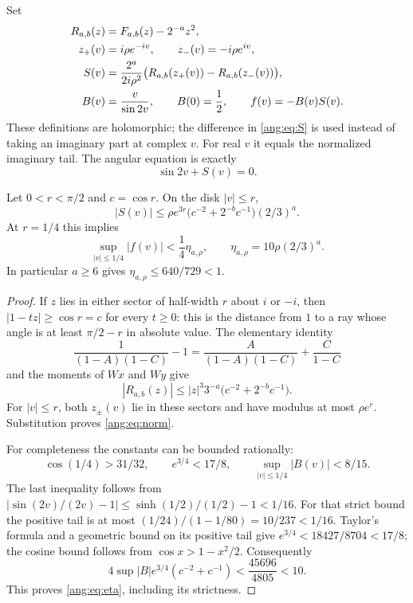 Set
\begin{align}
 R_{a,b}(z)&=F_{a,b}(z)-2^{-a}z^2,\notag\\
 z_+(v)&=i\rho e^{-iv},\qquad z_-(v)=-i\rho e^{iv},\notag\\
 S(v)&=\frac{2^a}{2i\rho^2}
       \bigl(R_{a,b}(z_+(v))-R_{a,b}(z_-(v))\bigr),
 \label{ang:eq:S}\\
 B(v)&=\frac{v}{\sin2v},\qquad B(0)=\frac12,
 \qquad f(v)=-B(v)S(v).
 \label{ang:eq:f}
\end{align}
These definitions are holomorphic; the difference in \eqref{ang:eq:S}
is used instead of taking an imaginary part at complex $v$.
For real $v$ it equals the normalized imaginary tail. The angular
equation is exactly
\begin{equation}
 \sin2v+S(v)=0.
 \label{ang:eq:angular}
\end{equation}

\begin{lemma}
\label{ang:lem:norm}
Let $0<r<\pi/2$ and $c=\cos r$. On the disk $|v|\le r$,
\begin{equation}
 |S(v)|\le
 \rho e^{3r}\bigl(c^{-2}+2^{-b}c^{-1}\bigr)(2/3)^a.
 \label{ang:eq:norm}
\end{equation}
At $r=1/4$ this implies
\begin{equation}
 \sup_{|v|\le1/4}|f(v)|<\frac14\eta_{a,\rho},
 \qquad \eta_{a,\rho}=10\rho(2/3)^a.
 \label{ang:eq:eta}
\end{equation}
In particular $a\ge6$ gives $\eta_{a,\rho}\le640/729<1$.
\end{lemma}
\begin{proof}
If $z$ lies in either sector of half-width $r$ about $i$ or $-i$,
then $|1-tz|\ge\cos r=c$ for every $t\ge0$: this is the
distance from $1$ to a ray whose angle is at least $\pi/2-r$ in
absolute value. The elementary identity
\[
 \frac1{(1-A)(1-C)}-1
 =\frac{A}{(1-A)(1-C)}+\frac{C}{1-C}
\]
and the moments of $Wx$ and $Wy$ give
\[
 |R_{a,b}(z)|
 \le |z|^3 3^{-a}\bigl(c^{-2}+2^{-b}c^{-1}\bigr).
\]
For $|v|\le r$, both $z_\pm(v)$ lie in these sectors and have
modulus at most $\rho e^r$. Substitution proves
\eqref{ang:eq:norm}.

For completeness the constants can be bounded rationally:
\[
 \cos(1/4)>31/32,\qquad e^{3/4}<17/8,
 \qquad \sup_{|v|\le1/4}|B(v)|<8/15.
\]
The last inequality follows from
$|\sin(2v)/(2v)-1|\le\sinh(1/2)/(1/2)-1<1/16$.
For that strict bound the positive tail is at most
$(1/24)/(1-1/80)=10/237<1/16$.
Taylor's formula and a geometric bound on its positive tail give
$e^{3/4}<18427/8704<17/8$; the cosine bound follows from
$\cos x>1-x^2/2$. Consequently
\[
 4\sup|B|e^{3/4}(c^{-2}+c^{-1})
 <\frac{45696}{4805}<10.
\]
This proves \eqref{ang:eq:eta}, including its strictness.
\end{proof}


